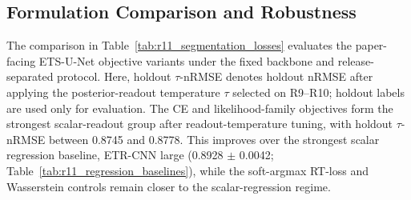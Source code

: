 \documentclass[12pt]{article}
\begin{document}
\subsection{Formulation Comparison and Robustness}

The comparison in Table~\ref{tab:r11_segmentation_losses} evaluates the paper-facing ETS-U-Net objective variants under the fixed backbone and release-separated protocol. Here, holdout \(\tau\)-nRMSE denotes holdout nRMSE after applying the posterior-readout temperature \(\tau\) selected on R9--R10; holdout labels are used only for evaluation. The CE and likelihood-family objectives form the strongest scalar-readout group after readout-temperature tuning, with holdout \(\tau\)-nRMSE between 0.8745 and 0.8778. This improves over the strongest scalar regression baseline, ETR-CNN large (0.8928 $\pm$ 0.0042; Table~\ref{tab:r11_regression_baselines}), while the soft-argmax RT-loss and Wasserstein controls remain closer to the scalar-regression regime.
\end{document}
